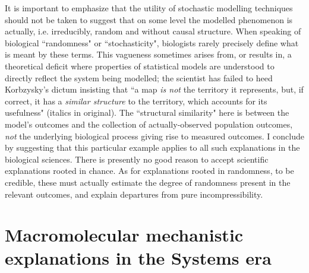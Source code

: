It is important to emphasize that the utility of stochastic modelling techniques should not be taken to suggest that on some level the modelled phenomenon is actually, i.e. irreducibly, random and without causal structure. When speaking of biological ``randomness" or ``stochasticity", biologists rarely precisely define what is meant by these terms. This vagueness sometimes arises from, or results in, a theoretical deficit where properties of statistical models are understood to directly reflect the system being modelled; the scientist has failed to heed Korbzysky's dictum insisting that ``a map \textit{is not} the territory it represents, but, if correct, it has a \textit{similar structure} to the territory, which accounts for its usefulness" \cite{Korzybski2005} (italics in original). The ``structural similarity" here is between the model's outcomes and the collection of actually-observed population outcomes, \textit{not} the underlying biological process giving rise to measured outcomes. I conclude by suggesting that this particular example applies to all such explanations in the biological sciences. There is presently no good reason to accept scientific explanations rooted in chance. As for explanations rooted in randomness, to be credible, these must actually estimate the degree of randomness present in the relevant outcomes, and explain departures from pure incompressibility.


\section{Macromolecular mechanistic explanations in the Systems era}



